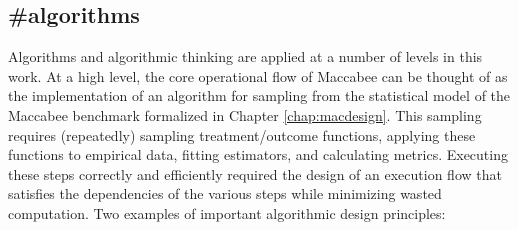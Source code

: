 \documentclass[./main.tex]{subfiles}
\begin{document}

\subsection{\textbf{\#algorithms}}
\label{hc:algorithms}

Algorithms and algorithmic thinking are applied at a number of levels in this work. At a high level, the core operational flow of Maccabee can be thought of as the implementation of an algorithm for sampling from the statistical model of the Maccabee benchmark formalized in Chapter \ref{chap:macdesign}. This sampling requires (repeatedly) sampling treatment/outcome functions, applying these functions to empirical data, fitting estimators, and calculating metrics. Executing these steps correctly and efficiently required the design of an execution flow that satisfies the dependencies of the various steps while minimizing wasted computation. Two examples of important algorithmic design principles:
\end{document}
